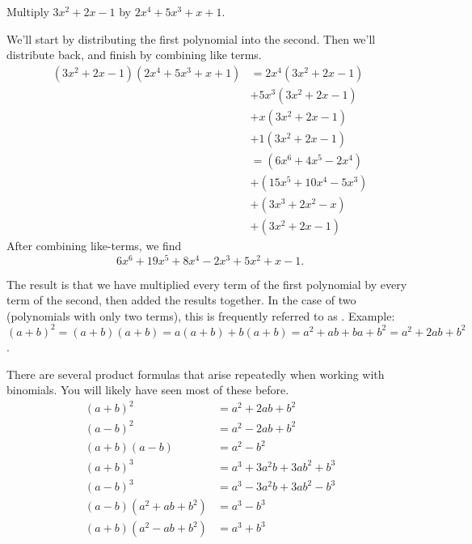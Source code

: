 \documentclass{ximera}
\begin{document}
\begin{example}
	Multiply $3x^2 + 2x - 1$ by $2x^4 + 5x^3+ x + 1$.
	\begin{explanation}
		We'll start by distributing the first polynomial into the second.  Then we'll distribute back, and finish by combining like terms.
		\begin{align*}
			(3x^2+ 2x-1)(2x^4 + 5x^3 + x +1) &= 2x^4(3x^2+ 2x-1) \\
			 &+ 5x^3 (3x^2+ 2x-1) \\
			 &+ x (3x^2+ 2x-1) \\
			 &+ 1(3x^2+ 2x-1)\\
				&= (6x^6 + 4x^5 - 2x^4) \\
				&+ (15x^5 + 10x^4 - 5x^3) \\
				&+ (3x^3+2x^2-x) \\
				&+(3x^2+2x-1)
		\end{align*}
		After combining like-terms, we find \[6x^6 + 19x^5 +8x^4 - 2x^3 + 5x^2+ x - 1.\]
	\end{explanation}
\end{example}
The result is that we have multiplied every term of the first polynomial by every term of the second, then added the results together.  In the case of two
 (polynomials with only two terms), this is frequently referred to as . Example: $(a+b)^2 = (a+b)(a+b)=a(a+b)+b(a+b)=a^2+ab+ba+b^2=a^2+2ab+b^2$.

There are several product formulas that arise repeatedly when working with binomials.  You will likely have seen most of these before.
		\begin{align*}
			(a + b)^2 &= a^2 + 2ab + b^2\\
			(a-b)^2 &= a^2 - 2ab + b^2\\
			(a+b)(a-b) &= a^2 - b^2\\
			(a+b)^3 &= a^3 + 3 a^2 b + 3 ab^2 + b^3\\
			(a-b)^3 &= a^3 - 3 a^2 b + 3 ab^2 - b^3\\
			(a-b)(a^2 + ab + b^2) &= a^3 - b^3\\
			(a+b)(a^2-ab+b^2) &= a^3 + b^3
		\end{align*}
\end{document}
